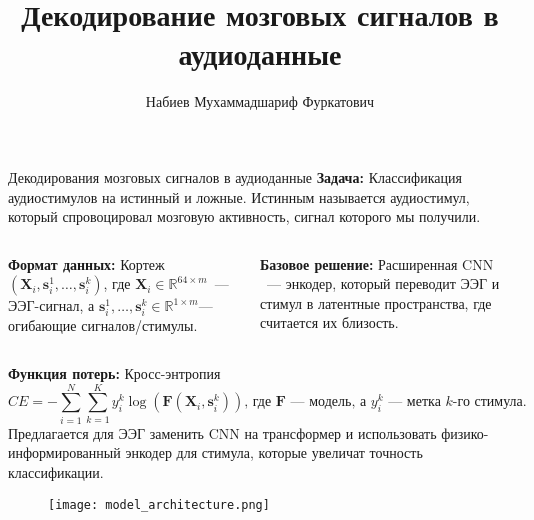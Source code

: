 \documentclass{beamer}
\title[\hbox to 56mm{Декодирование мозговых сигналов в аудиоданные}]{Декодирование мозговых сигналов в аудиоданные}
\author[Набиев М.\, Ф.]{Набиев Мухаммадшариф Фуркатович}
\institute{Московский физико-технический институт}
\date{\footnotesize
\par\smallskip\emph{Руководитель:} Северилов Павел Андреевич
\par\bigskip\small 2024}
\begin{document}
\begin{frame}
\thispagestyle{empty}
\maketitle
\end{frame}
\begin{frame}{Декодирования мозговых сигналов в аудиоданные}
\footnotesize \textbf{Задача:} Классификация аудиостимулов на истинный и ложные. Истинным называется аудиостимул, который спровоцировал мозговую активность, сигнал которого мы получили.
\smallskip \smallskip 
\begin{columns}[c]
    \scriptsize \textbf{Формат данных:} Кортеж $(\mathbf{X}_i, \mathbf{s}_i^1, \dots, \mathbf{s}_i^k)$, где $\mathbf{X}_i \in \mathbb{R}^{64 \times m}$~--- ЭЭГ-сигнал, а $\mathbf{s}_i^1, \dots, \mathbf{s}_i^k \in \mathbb{R}^{1 \times m}$--- огибающие сигналов/стимулы.
    
    \scriptsize \textbf{Базовое решение:} Расширенная CNN ~--- энкодер, который переводит ЭЭГ и стимул в латентные пространства, где считается их близость.

\end{columns}
\smallskip \smallskip 
\scriptsize \textbf{Функция потерь:} Кросс-энтропия
$$CE = - \sum_{i=1}^N\sum_{k=1}^K y_i^k \log (\mathbf{F}(\mathbf{X}_i, \mathbf{s}_i^k)), \, \text {где $\mathbf{F}$~--- модель, а $y_i^k$~--- метка $k$-го стимула.}$$
\scriptsize Предлагается для ЭЭГ заменить CNN на трансформер и использовать физико-информированный энкодер для стимула, которые увеличат точность классификации.
\begin{figure}
        \centering
        \texttt{[image: model\_architecture.png]}
\end{figure}
\end{frame}
\end{document}
